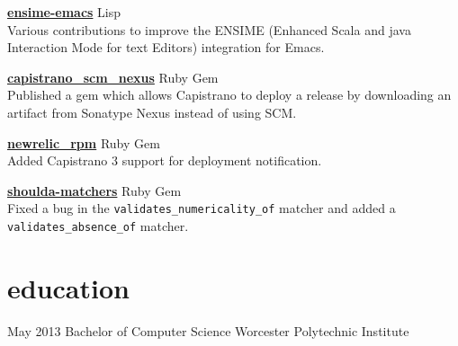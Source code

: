 \documentclass[]{friggeri-cv}
\begin{document}
{\href{https://github.com/ensime/ensime-emacs}{\textbf{ensime-emacs}}}
\hfill{\footnotesize {} Lisp} \\
Various contributions to improve the ENSIME (Enhanced Scala and java
Interaction Mode for text Editors) integration for Emacs.

{\href{https://github.com/jmpage/capistrano_scm_nexus}{\textbf{capistrano\_scm\_nexus}}} \hfill {\footnotesize{} Ruby Gem} \\
Published a gem which allows Capistrano to deploy a release by downloading an artifact from Sonatype Nexus instead of using SCM.

{\href{https://github.com/newrelic/rpm}{\textbf{newrelic\_rpm}}} \hfill {\footnotesize{} Ruby Gem} \\
Added Capistrano 3 support for deployment notification.

{\href{https://github.com/thoughtbot/shoulda-matchers}{\textbf{shoulda-matchers}}} \hfill {\footnotesize{} Ruby Gem} \\
Fixed a bug in the \verb|validates_numericality_of| matcher and added a \verb|validates_absence_of| matcher.

\section{education}

\begin{entrylist}
  \entryoneline
    {May 2013}
    {Bachelor {\normalfont of Computer Science}}
    {Worcester Polytechnic Institute}
\end{entrylist}
\end{document}
